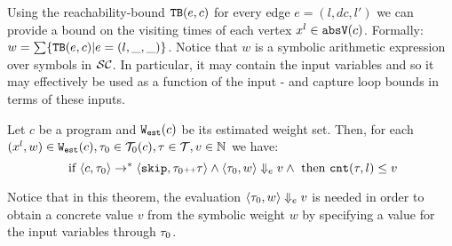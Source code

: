 Using the reachability-bound ${\mathtt{TB}}(e, c)$ for every edge $e = (l, dc, l')$ we can provide a bound on the visiting times of each vertex $x^l \in \mathtt{abs}{\mathtt{V}}(c)$. Formally: $w = \sum\left\{  \absclr(e, c) \middle\vert e = (l, \_, \_) \right\}$.
Notice that $w$ is a symbolic arithmetic expression over symbols in $\mathcal{SC}$. In particular, it may contain the input variables and so it may effectively be used as a function of the input - and capture loop bounds in terms of these inputs.
 
 \begin{thm}
    \label{thm:addweight_soundness}
  Let  ${c}$ be a program and $\mathtt{{W_{est}}}(c)$ be its estimated weight set.
  Then, for each $(x^l, w) \in \mathtt{{W_{est}}}(c),\mathtt{\tau}_0 \in \mathcal{T}_0(c), \mathtt{\tau} \in \mathcal{T},
  v \in \mathbb{N}$ we have:
  \[
   \text{ if }
  \langle {c}, \mathtt{\tau}_0 \rangle \to^{*} \langle \mathtt{skip}, \mathtt{\tau}_0 {\scriptscriptstyle ++}\mathtt{\tau} \rangle 
  \land 
  \langle \mathtt{\tau}_0, w \rangle \Downarrow_e v
  \land
  \text{ then }
  \mathtt{cnt}(\mathtt{\tau}, l) \leq v
  \]
  \end{thm}
Notice that in this theorem, the evaluation $\langle \mathtt{\tau}_0, w \rangle \Downarrow_e v$ is needed in order to obtain a concrete value $v$ from the symbolic weight $w$ by specifying a value for the input variables through $\mathtt{\tau}_0$.

